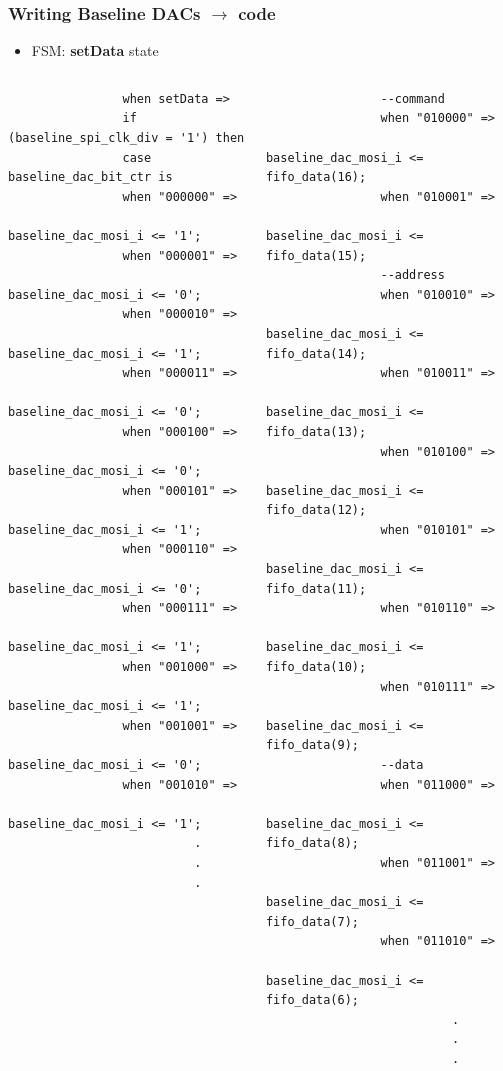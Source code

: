 \documentclass[aspectratio=169]{beamer}
\begin{document}
	\begin{frame}[fragile]
	\frametitle{Writing Baseline DACs $\rightarrow$ code}
	\begin{itemize}
		\item FSM: \textbf{setData} state
	\end{itemize}
	{\tiny
		\begin{columns}
			
			\begin{center}
				\begin{verbatim}
				when setData =>
				if (baseline_spi_clk_div = '1') then
				case baseline_dac_bit_ctr is
				when "000000" =>
				baseline_dac_mosi_i <= '1';
				when "000001" =>
				baseline_dac_mosi_i <= '0';
				when "000010" =>
				baseline_dac_mosi_i <= '1';
				when "000011" => 
				baseline_dac_mosi_i <= '0';		
				when "000100" =>
				baseline_dac_mosi_i <= '0';
				when "000101" =>
				baseline_dac_mosi_i <= '1';
				when "000110" =>
				baseline_dac_mosi_i <= '0';
				when "000111" =>
				baseline_dac_mosi_i <= '1';		
				when "001000" =>
				baseline_dac_mosi_i <= '1';
				when "001001" =>
				baseline_dac_mosi_i <= '0';
				when "001010" =>
				baseline_dac_mosi_i <= '1';
				          .
				          .
				          .
				\end{verbatim}
			\end{center}
			
			\begin{center}
				\begin{verbatim}
				--command
				when "010000" =>
				baseline_dac_mosi_i <= fifo_data(16); 
				when "010001" =>
				baseline_dac_mosi_i <= fifo_data(15); 
				--address
				when "010010" =>
				baseline_dac_mosi_i <= fifo_data(14); 
				when "010011" =>
				baseline_dac_mosi_i <= fifo_data(13); 
				when "010100" =>
				baseline_dac_mosi_i <= fifo_data(12); 
				when "010101" =>
				baseline_dac_mosi_i <= fifo_data(11); 
				when "010110" =>
				baseline_dac_mosi_i <= fifo_data(10); 
				when "010111" =>
				baseline_dac_mosi_i <= fifo_data(9);  
				--data
				when "011000" =>
				baseline_dac_mosi_i <= fifo_data(8);  
				when "011001" =>
				baseline_dac_mosi_i <= fifo_data(7);  
				when "011010" =>
				baseline_dac_mosi_i <= fifo_data(6);  
				          .
				          .
				          .
				\end{verbatim}
			\end{center}
		\end{columns} 
	}
	\end{frame}
\end{document}
